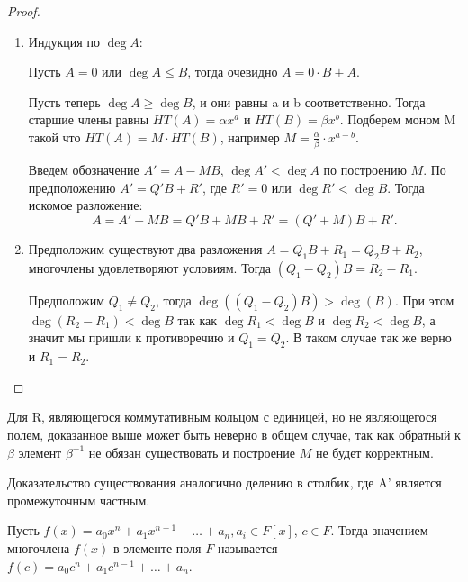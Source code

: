 \begin{proof}~
    \begin{enumerate}
        \item Индукция по $\deg A$:
    
        Пусть $A = 0$ или $\deg A \leq B$, тогда очевидно $A = 0 \cdot B +A$.

        Пусть теперь $\deg A \geq \deg B$, и они равны a и b соответственно. Тогда старшие 
        члены равны $HT(A) = \alpha x^a$ и $HT(B) = \beta x^b$. Подберем моном M такой что 
        $HT(A) = M \cdot HT(B)$, например $M = \frac{\alpha}{\beta} \cdot x^{a - b}$.

        Введем обозначение $A' = A - MB$, $\deg A' < \deg A$ по построению $M$. По предположению 
        $A' = Q'B + R'$, где $R' = 0$ или $\deg R' < \deg B$. Тогда искомое разложение: 
        $$A = A' + MB = Q'B + MB + R' = (Q' + M)B + R'.$$

        \item Предположим существуют два разложения $A = Q_1 B + R_1 = Q_2 B + R_2$, многочлены 
        удовлетворяют условиям. Тогда $(Q_1 - Q_2)B = R_2 - R_1$. 
        
        Предположим $Q_1 \neq Q_2$, тогда $\deg((Q_1 - Q_2)B) > \deg(B)$.
        При этом $\deg (R_2 - R_1) < \deg B$ так как $\deg R_1 < \deg B$ и $\deg R_2 < \deg B$, 
        а значит мы пришли к противоречию и $Q_1 = Q_2$. В таком 
        случае так же верно и $R_1 = R_2$. 
    \end{enumerate}
\end{proof}

\begin{note}
    Для R, являющегося коммутативным кольцом с единицей, но не являющегося полем, доказанное выше 
    может быть неверно в общем случае, так как обратный к $\beta$ элемент $\beta^{-1}$ не обязан существовать 
    и построение $M$ не будет корректным.
\end{note}

\begin{note}
    Доказательство существования аналогично делению в столбик, где A' является промежуточным частным.
\end{note}

\begin{definition}
    Пусть $f(x) = a_0 x^n + a_{1} x^{n-1} + \dots + a_n, a_i \in F[x]$, $c \in F$. 
    Тогда значением многочлена $f(x)$ в элементе поля $F$ называется
    $f(c) = a_0 c^n + a_{1} c^{n-1} + \dots + a_n$.
\end{definition}

